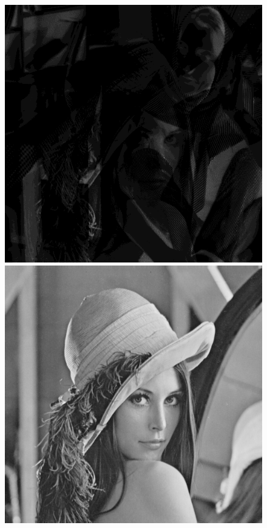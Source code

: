 \documentclass{article}
\begin{document}
\begin{figure}[!htb]
\includegraphics[scale=0.2]{img/_Dzielenie_Obrazka__lena_8bit_barbara_8bit.png} \\
\includegraphics[scale=0.2]{img/lena_8bit.png}

\end{figure}
\end{document}
